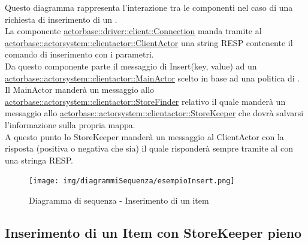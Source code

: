 \documentclass{scalatekids-article}
\begin{document}
Questo diagramma rappresenta l'interazione tra le componenti nel caso di una richiesta di inserimento di un .\\
La componente \hyperref[sec:actorbase::driver::client::Connection]{actorbase::driver::client::Connection}
manda tramite  al \hyperref[sec:actorbase::actorsystem::clientactor::ClientActor]{actorbase::actorsystem::clientactor::ClientActor}
una string RESP contenente il comando di inserimento  con
i parametri.\\ %
Da questo componente parte il messaggio di Insert(key, value) ad un \hyperref[sec:actorbase::actorsystem::clientactor::MainActor]{actorbase::actorsystem::clientactor::MainActor} scelto in base ad una
politica di . Il MainActor manderà un messaggio allo \hyperref[sec:actorbase::actorsystem::clientactor::StoreFinder]{actorbase::actorsystem::clientactor::StoreFinder} relativo il quale manderà un messaggio allo \hyperref[sec:actorbase::actorsystem::clientactor::StoreKeeper]{actorbase::actorsystem::clientactor::StoreKeeper} che dovrà salvarsi l'informazione
sulla propria mappa.\\
A questo punto lo StoreKeeper manderà un messaggio al ClientActor con la risposta
(positiva o negativa che sia) il quale risponderà sempre tramite  al  con una stringa RESP.
\begin{figure}[H]
  \begin{center}
    \texttt{[image: img/diagrammiSequenza/esempioInsert.png]}
    \caption{Diagramma di sequenza - Inserimento di un item}
  \end{center}
\end{figure}

\subsection{Inserimento di un Item con StoreKeeper pieno}
\end{document}

